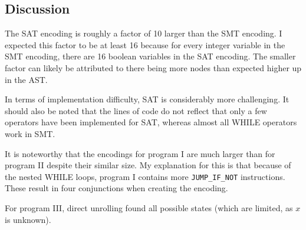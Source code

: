 \documentclass[sigconf,natbib=false]{acmart}
\begin{document}
\subsection{Discussion}
The SAT encoding is roughly a factor of 10 larger than the SMT encoding. I expected this factor to be at least 16 because for every integer variable in the SMT encoding, there are 16 boolean variables in the SAT encoding. The smaller factor can likely be attributed to there being more nodes than expected higher up in the AST.

In terms of implementation difficulty, SAT is considerably more challenging. It should also be noted that the lines of code do not reflect that only a few operators have been implemented for SAT, whereas almost all WHILE operators work in SMT.

It is noteworthy that the encodings for program I are much larger than for program II despite their similar size. My explanation for this is that because of the nested WHILE loops, program I contains more \texttt{JUMP\_IF\_NOT} instructions. These result in four conjunctions when creating the encoding.

For program III, direct unrolling found all possible states (which are limited, as \( x \) is unknown).





\printbibliography
\end{document}
